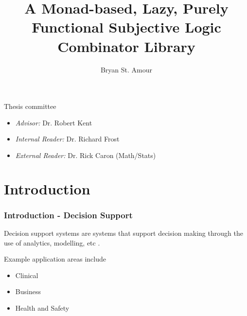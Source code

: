 \documentclass{beamer}
\title{A Monad-based, Lazy, Purely Functional Subjective Logic Combinator Library}
\author{Bryan St. Amour}
\begin{document}
%
%

\begin{frame}
\titlepage
\end{frame}

\begin{frame}

Thesis committee

\begin{itemize}
  \item \emph{Advisor:} Dr. Robert Kent
  \item \emph{Internal Reader:} Dr. Richard Frost
  \item \emph{External Reader:} Dr. Rick Caron (Math/Stats)
\end{itemize}

\end{frame}


\begin{frame}
\tableofcontents
\end{frame}


%
%

\section{Introduction}

\begin{frame}
\frametitle{Introduction - Decision Support}

Decision support systems are systems that support decision making
through the use of analytics, modelling, etc \cite{sprague_framework_1980}.

Example application areas include

\begin{itemize}
  \item Clinical \cite{berner2007clinical}
  \item Business \cite{klein_knowledge-based}
  \item Health and Safety \cite{kent2010application}
\end{itemize}

\end{frame}
\end{document}
